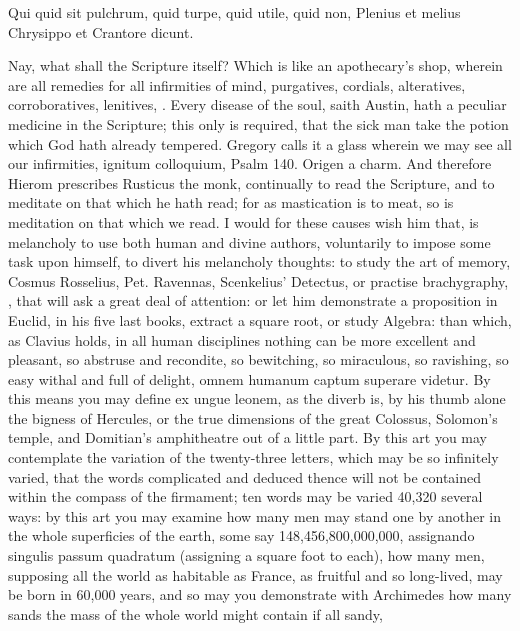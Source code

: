 {Qui quid sit pulchrum, quid turpe, quid utile, quid non,
Plenius et melius Chrysippo et Crantore dicunt.

Nay, what shall the Scripture itself? Which is like an apothecary's
shop, wherein are all remedies for all infirmities of mind, purgatives,
cordials, alteratives, corroboratives, lenitives, \etc{}. Every disease of
the soul, saith Austin, hath a peculiar medicine in the
Scripture; this only is required, that the sick man take the potion
which God hath already tempered. Gregory calls it a glass wherein
we may see all our infirmities, ignitum colloquium, Psalm  140.
Origen a charm. And therefore Hierom prescribes Rusticus the
monk, continually to read the Scripture, and to meditate on that
which he hath read; for as mastication is to meat, so is meditation on
that which we read. I would for these causes wish him that, is
melancholy to use both human and divine authors, voluntarily to impose
some task upon himself, to divert his melancholy thoughts: to study the
art of memory, Cosmus Rosselius, Pet. Ravennas, Scenkelius' Detectus,
or practise brachygraphy, \etc{}, that will ask a great deal of attention:
or let him demonstrate a proposition in Euclid, in his five last books,
extract a square root, or study Algebra: than which, as Clavius
holds, in all human disciplines nothing can be more excellent and
pleasant, so abstruse and recondite, so bewitching, so miraculous, so
ravishing, so easy withal and full of delight, omnem humanum captum
superare videtur. By this means you may define ex ungue leonem, as the
diverb is, by his thumb alone the bigness of Hercules, or the true
dimensions of the great Colossus, Solomon's temple, and
Domitian's amphitheatre out of a little part. By this art you may
contemplate the variation of the twenty-three letters, which may be so
infinitely varied, that the words complicated and deduced thence will
not be contained within the compass of the firmament; ten words may be
varied 40,320 several ways: by this art you may examine how many men
may stand one by another in the whole superficies of the earth, some
say 148,456,800,000,000, assignando singulis passum quadratum
(assigning a square foot to each), how many men, supposing all the
world as habitable as France, as fruitful and so long-lived, may be
born in 60,000 years, and so may you demonstrate with Archimedes
how many sands the mass of the whole world might contain if all sandy,
}
